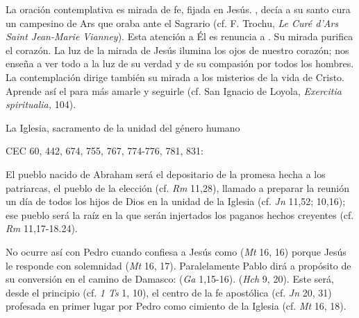 	 La oración contemplativa es mirada de fe, fijada en Jesús. , decía a su santo cura un campesino de Ars que oraba ante el Sagrario (cf. F. Trochu, \emph{Le Curé d'Ars Saint Jean-Marie Vianney}). Esta atención a Él es renuncia a . Su mirada purifica el corazón. La luz de la mirada de Jesús ilumina los ojos de nuestro corazón; nos enseña a ver todo a la luz de su verdad y de su compasión por todos los hombres. La contemplación dirige también su mirada a los misterios de la vida de Cristo. Aprende así el  para más amarle y seguirle (cf. San Ignacio de Loyola, \emph{Exercitia spiritualia,} 104).
	
	La Iglesia, sacramento de la unidad del género humano
	
	CEC 60, 442, 674, 755, 767, 774-776, 781, 831:
	
	 El pueblo nacido de Abraham será el depositario de la promesa hecha a los patriarcas, el pueblo de la elección (cf. \emph{Rm} 11,28), llamado a preparar la reunión un día de todos los hijos de Dios en la unidad de la Iglesia (cf. \emph{Jn} 11,52; 10,16); ese pueblo será la raíz en la que serán injertados los paganos hechos creyentes (cf. \emph{Rm} 11,17-18.24).
	
	 No ocurre así con Pedro cuando confiesa a Jesús como  (\emph{Mt} 16, 16) porque Jesús le responde con solemnidad  (\emph{Mt} 16, 17). Paralelamente Pablo dirá a propósito de su conversión en el camino de Damasco:  (\emph{Ga} 1,15-16).  (\emph{Hch} 9, 20). Este será, desde el principio (cf. \emph{1 Ts} 1, 10), el centro de la fe apostólica (cf. \emph{Jn} 20, 31) profesada en primer lugar por Pedro como cimiento de la Iglesia (cf. \emph{Mt} 16, 18).
	
